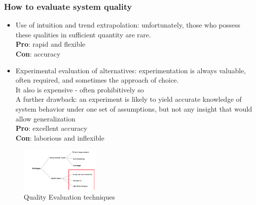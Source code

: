\documentclass[10pt, oneside]{article}
\begin{document}
\subsubsection{How to evaluate system quality}
\begin{itemize}
    \item Use of intuition and trend extrapolation: unfortunately, those who possess these qualities in sufficient
    quantity are rare.\\{\bf Pro}: rapid and flexible\\
    {\bf Con}: accuracy
    \item Experimental evaluation of alternatives: experimentation is always valuable, often required, and
    sometimes the approach of choice.\\It also is expensive - often prohibitively so\\A further drawback: an experiment is likely to yield accurate
    knowledge of system behavior under one set of assumptions, but
    not any insight that would allow generalization\\{\bf Pro}: excellent accuracy\\
    {\bf Con}: laborious and inflexible
\end{itemize}
\begin{figure}[H]
    \begin{center}
    \includegraphics[width=0.35\textwidth]{img/img92.png}
    \caption{Quality Evaluation techniques}
    \end{center}
\end{figure}
\end{document}
